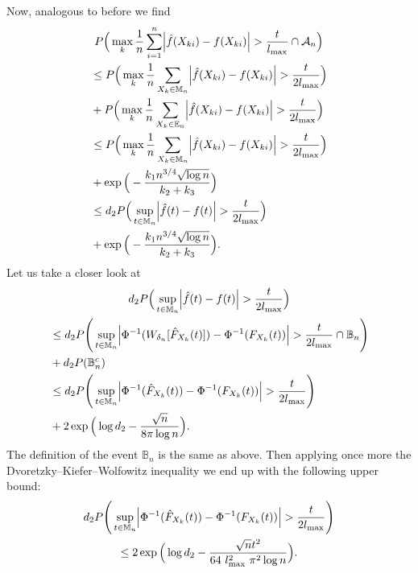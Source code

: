 Now, analogous to before we find
\begin{multline}\label{eq::std}
        P\Big(\max_k \frac{1}{n} \sum_{i=1}^n \abs{\hat{f}(X_{ki}) - f(X_{ki})} > \frac{t}{l_{\max}} \cap \mathcal{A}_n \Big) \\
        \begin{aligned}
            &\leq P\Big(\max_k \frac{1}{n} \sum_{X_{k} \in \mathbb{M}_n} \abs{\hat{f}(X_{ki}) - f(X_{ki})} > \frac{t}{2l_{\max}}\Big) \\
            &+ P\Big(\max_k \frac{1}{n} \sum_{X_{k} \in \mathbb{E}_n} \abs{\hat{f}(X_{ki}) - f(X_{ki})} > \frac{t}{2l_{\max}}\Big) \\
            &\leq P\Big(\max_k \frac{1}{n} \sum_{X_{k} \in \mathbb{M}_n} \abs{\hat{f}(X_{ki}) - f(X_{ki})} > \frac{t}{2l_{\max}} \Big) \\
            &+ \exp\Big(- \frac{k_1 n^{3/4} \sqrt{\log n}}{k_2+ k_3} \Big) \\
            &\leq d_2P\Big(\sup_{t \in \mathbb{M}_n} \abs{\hat{f}(t) - f(t)} > \frac{t}{2l_{\max}} \Big) \\
            &+ \exp\Big(- \frac{k_1 n^{3/4} \sqrt{\log n}}{k_2+ k_3} \Big).
        \end{aligned}
\end{multline}
Let us take a closer look at 
\begin{multline*}
    d_2P\Big(\sup_{t \in \mathbb{M}_n} \abs{\hat{f}(t) - f(t)} > \frac{t}{2l_{\max}} \Big) \\
    \begin{aligned}
    &\leq d_2P\Bigg(\sup_{t \in \mathbb{M}_n} \abs{\Phi^{-1}(W_{\delta_n}[\hat{F}_{X_k}(t)]) - \Phi^{-1}(F_{X_k}(t))} > \frac{t}{2l_{\max}} \cap \mathbb{B}_n\Bigg) \\
    &+ d_2P(\mathbb{B}_n^c) \\
    &\leq d_2P\Bigg(\sup_{t \in \mathbb{M}_n} \abs{\Phi^{-1}(\hat{F}_{X_k}(t)) - \Phi^{-1}(F_{X_k}(t))} > \frac{t}{2l_{\max}} \Bigg) \\
    &+ 2\exp\Big(\log d_2 - \frac{\sqrt{n}}{8\pi\log n}\Big).
    \end{aligned}
\end{multline*}
The definition of the event $\mathbb{B}_n$ is the same as above. Then applying once more the Dvoretzky–Kiefer–Wolfowitz inequality we end up with the following upper bound:
\begin{multline*}
         d_2P\Bigg(\sup_{t \in \mathbb{M}_n} \abs{\Phi^{-1}(\hat{F}_{X_k}(t)) - \Phi^{-1}(F_{X_k}(t))} > \frac{t}{2l_{\max}} \Bigg) \\
         \leq 2\exp\Big(\log d_2 -\frac{\sqrt{n}t^2}{64 \ l_{\max}^2 \ \pi^2\log n}\Big).
\end{multline*}

